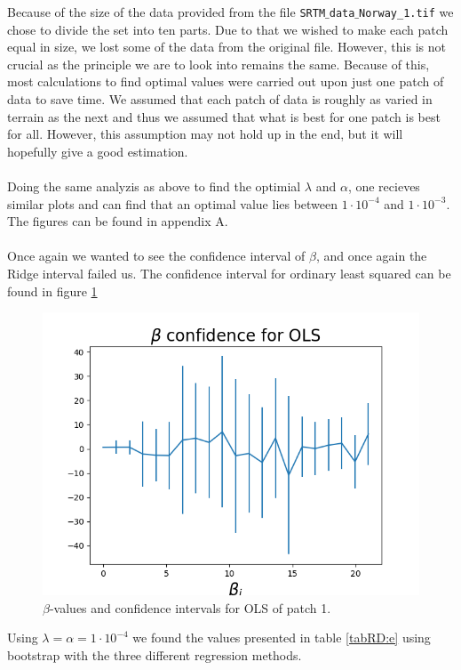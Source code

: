 \documentclass[12pt]{article}
\newcommand{\E}[1]{\cdot 10^{#1}}
\begin{document}
Because of the size of the data provided from the file \texttt{SRTM$\_$data$\_$Norway\_1.tif} we chose to divide the set into ten parts. Due to that we wished to make each patch equal in size, we lost some of the data from the original file. However, this is not crucial as the principle we are to look into remains the same. Because of this, most calculations to find optimal values were carried out upon just one patch of data to save time. We assumed that each patch of data is roughly as varied in terrain as the next and thus we assumed that what is best for one patch is best for all. However, this assumption may not hold up in the end, but it will hopefully give a good estimation. \\ \\
Doing the same analyzis as above to find the optimial $\lambda$ and $\alpha$, one recieves similar plots and can find that an optimal value lies between $1\E{-4}$ and $1\E{-3}$. The figures can be found in appendix A. \\ \\
Once again we wanted to see the confidence interval of $\beta$, and once again the Ridge interval failed us. The confidence interval for ordinary least squared can be found in figure \ref{figRD:confe}
\begin{figure}[H]
\centering
\includegraphics[scale=0.5]{../figures/e-OLS-contour-beta-patch0.png}
\caption{$\beta$-values and confidence intervals for OLS of patch 1.}
\label{figRD:confe}
\end{figure}
Using $\lambda = \alpha = 1\E{-4}$ we found the values presented in table \ref{tabRD:e} using bootstrap with the three different regression methods.
\end{document}
